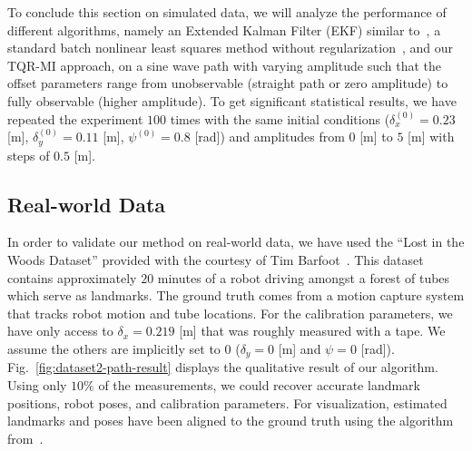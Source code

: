 To conclude this section on simulated data, we will analyze the performance of
different algorithms, namely an Extended Kalman Filter (EKF) similar
to~\cite{martinelli06automatic}, a standard batch nonlinear least squares
method without regularization~\cite{kuemmerle11simultaneous}, and our TQR-MI
approach, on a sine wave path with varying amplitude such that the offset
parameters range from unobservable (straight path or zero amplitude) to
fully observable (higher amplitude). To get significant statistical results, we
have repeated the experiment $100$ times with the same initial conditions
($\delta_x^{(0)}=0.23$ [m], $\delta_y^{(0)}=0.11$ [m], $\psi^{(0)}=0.8$ [rad])
and amplitudes from $0$ [m] to $5$ [m] with steps of $0.5$ [m].


\subsection{Real-world Data}

In order to validate our method on real-world data, we have used the ``Lost in
the Woods Dataset'' provided with the courtesy of Tim
Barfoot~\cite{tong12gaussian}. This dataset contains approximately $20$ minutes
of a robot driving amongst a forest of tubes which serve as landmarks. The
ground truth comes from a motion capture system that tracks robot motion and
tube locations. For the calibration parameters, we have only access to
$\delta_x=0.219$ [m] that was roughly measured with a tape. We assume the others
are implicitly set to $0$ ($\delta_y=0$ [m] and $\psi=0$ [rad]).
Fig.~\ref{fig:dataset2-path-result} displays the qualitative result of our
algorithm. Using only $10\%$ of the measurements, we could recover accurate
landmark positions, robot poses, and calibration parameters. For visualization,
estimated landmarks and poses have
been aligned to the ground truth using the algorithm
from~\cite{fiore01efficient}.

